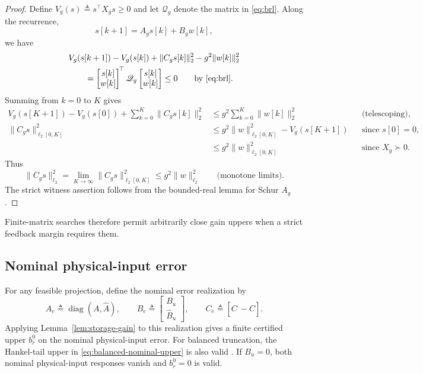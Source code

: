 \documentclass{l4dc2027}
\newcommand{\eqdef}{\triangleq}
\begin{document}
\begin{proof}
Define \mbox{$V_g(s)\eqdef s^\top X_gs\ge0$} and let \mbox{$\mathscr Q_g$} denote the matrix in \eqref{eq:brl}.
Along the recurrence,
\[
 s[k+1]=A_gs[k]+B_gw[k],
\]
we have
\[
 \begin{aligned}
 &V_g(s[k+1])-V_g(s[k])
   +\|C_gs[k]\|_2^2-g^2\|w[k]\|_2^2\\
 &\qquad=\begin{bmatrix}s[k]\\w[k]\end{bmatrix}^{\!\top}
 \mathscr Q_g\begin{bmatrix}s[k]\\w[k]\end{bmatrix}
 \le0
 \qquad\text{by \eqref{eq:brl}}.
 \end{aligned}
\]
Summing from \mbox{$k=0$} to \mbox{$K$} gives
\[
 \begin{aligned}
 V_g(s[K+1])-V_g(s[0])
 +\sum_{k=0}^K\|C_gs[k]\|_2^2
 &\le g^2\sum_{k=0}^K\|w[k]\|_2^2
 &&\text{(telescoping)},\\
 \|C_gs\|_{\ell_2[0,K]}^2
 &\le g^2\|w\|_{\ell_2[0,K]}^2-V_g(s[K+1])
 &&\text{since }s[0]=0,\\
 &\le g^2\|w\|_{\ell_2[0,K]}^2
 &&\text{since }X_g\succ0.
 \end{aligned}
\]
Thus
\[
 \|C_gs\|_{\ell_2}^2
 =\lim_{K\to\infty}\|C_gs\|_{\ell_2[0,K]}^2
 \le g^2\|w\|_{\ell_2}^2
 \qquad\text{(monotone limits)}.
\]
The strict witness assertion follows from the bounded-real lemma for Schur \mbox{$A_g$} \citep{antoulas}.
\end{proof}
Finite-matrix searches therefore permit arbitrarily close gain uppers when a strict feedback margin requires them.

\subsection{Nominal physical-input error}
For any feasible projection, define the nominal error realization by
\[
 A_e\eqdef\operatorname{diag}(A,\widehat A),\qquad
 B_e\eqdef\begin{bmatrix}B_u\\\widehat B_u\end{bmatrix},\qquad
 C_e\eqdef[C\ -\widehat C].
\]
Applying Lemma~\ref{lem:storage-gain} to this realization gives a finite certified upper \mbox{$b_r^0$} on the nominal physical-input error.
For balanced truncation, the Hankel-tail upper in \eqref{eq:balanced-nominal-upper} is also valid \citep{antoulas}.
If \mbox{$B_u=0$}, both nominal physical-input responses vanish and \mbox{$b_r^0=0$} is valid.
\end{document}
